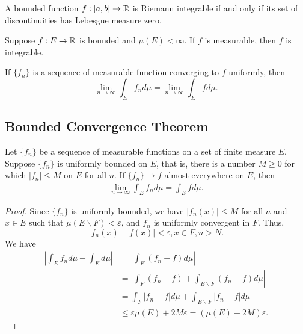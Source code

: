 \documentclass[class=book, crop=false]{standalone}
\begin{document}
        \begin{theorem}
            A bounded function $f : [a, b] \rightarrow \mathbb{R}$ is Riemann integrable if and only if its set of discontinuities has Lebesgue measure zero.
        \end{theorem}

        \begin{theorem}
            Suppose $f : E \rightarrow \mathbb{R}$ is bounded and $\mu(E) < \infty$. If $f$ is measurable, then $f$ is integrable.
        \end{theorem}

        \begin{theorem}
            If $\{f_n\}$ is a sequence of measurable function converging to $f$ uniformly, then
            \begin{equation*}
                \lim_{n \rightarrow \infty} \int_E f_n d\mu = \lim_{n \rightarrow \infty} \int_E f d\mu.
            \end{equation*}
        \end{theorem}

        \subsection{Bounded Convergence Theorem}
        \begin{theorem}
            Let $\{f_n\}$ be a sequence of measurable functions on a set of finite measure $E$. Suppose $\{f_n\}$ is uniformly bounded on $E$, that is, there is a number $M \geq 0$ for which $|f_n| \leq M$ on $E$ for all $n$. If $\{f_n\} \rightarrow f$ almost everywhere on $E$, then
            \begin{align*}
                \lim_{n \rightarrow \infty} \int_E f_n d\mu = \int_E f d\mu.
            \end{align*}
        \end{theorem}
        \begin{proof}
            Since $\{f_n\}$ is uniformly bounded, we have $|f_n(x)| \leq M$ for all $n$ and $x \in E$ such that $\mu(E \backslash F) < \varepsilon$, and $f_n$ is uniformly convergent in $F$. Thus,
            \begin{equation*}
                |f_n(x) - f(x)| < \varepsilon, x \in F, n > N.
            \end{equation*}
            We have
            \begin{align*}
                \left|\int_E f_n d\mu - \int_E d\mu\right| &= \left|\int_E (f_n - f) d\mu\right| \\
                &= \left|\int_F (f_n - f) + \int_{E \backslash F} (f_n - f) d\mu\right| \\
                &= \int_F |f_n - f| d\mu + \int_{E \backslash F} |f_n - f| d\mu \\
                &\leq \varepsilon \mu(E) + 2M\varepsilon = (\mu(E) + 2M)\varepsilon.
            \end{align*}
        \end{proof}
        
\end{document}
